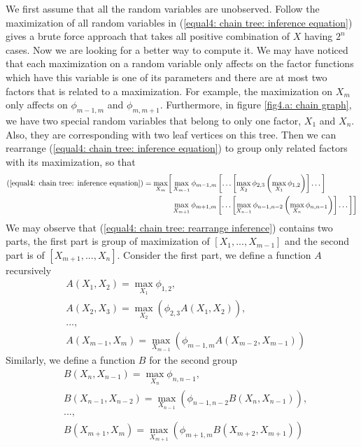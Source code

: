 We first assume that all the random variables are unobserved. Follow the maximization of all random variables in (\ref{equal4: chain tree: inference equation}) gives a brute force approach that takes all positive combination of $X$ having $2^n$ cases. Now we are looking for a better way to compute it. We may have noticed that each maximization on a random variable only affects on the factor functions which have this variable is one of its parameters and there are at most two factors that is related to a maximization. For example, the maximization on $X_m$ only affects on $\phi_{m-1, m}$ and $\phi_{m, m+1}$. Furthermore, in figure \ref{fig4.a: chain graph}, we have two special random variables that belong to only one factor, $X_1$ and $X_n$. Also, they are corresponding with two leaf vertices on this tree. Then we can rearrange (\ref{equal4: chain tree: inference equation}) to group only related factors with its maximization, so that
\begin{align}
	\begin{split}
		(\ref{equal4: chain tree: inference equation}) = \max_{X_m} \biggl[
		& \max_{X_{m-1}}{
			\phi_{m-1, m} \left[ \dots \left[  \max_{X_2}{
				\phi_{2,3} \left( \max_{X_1}{\phi_{1,2}} \right)
			} \right] \dots \right]
		} \\
		& \max_{X_{m+1}}{
			\phi_{m+1, m} \left[ \dots \left[  \max_{X_{n-1}}{
				\phi_{n-1,n-2} \left( \max_{X_n}{\phi_{n,n-1}} \right)
			} \right] \dots \right]
		}
		\biggr]
	\end{split}
	\label{equal4: chain tree: rearrange inference}
\end{align}
We may observe that (\ref{equal4: chain tree: rearrange inference}) contains two parts, the first part is group of maximization of $[X_1, ..., X_{m-1}]$ and the second part is of $[X_{m+1}, ..., X_{n}]$. Consider the first part, we define a function $A$ recursively
\begin{align*}
	& A(X_1, X_2) = \max_{X_1}{\phi_{1,2}}, \\
	& A(X_2, X_3) = \max_{X_2}{\left( \phi_{2,3}A(X_1, X_2) \right)}, \\
	& ..., \\
	& A(X_{m-1}, X_m) = \max_{X_{m-1}}{\left( \phi_{m-1,m}A(X_{m-2}, X_{m-1}) \right)}
\end{align*}
Similarly, we define a function $B$ for the second group
\begin{align*}
	& B(X_n, X_{n-1}) = \max_{X_n}{\phi_{n,n-1}}, \\
	& B(X_{n-1}, X_{n-2}) = \max_{X_{n-1}}{\left( \phi_{n-1,n-2}B(X_{n}, X_{n-1}) \right)}, \\
	& ..., \\
	& B(X_{m+1}, X_m) = \max_{X_{m+1}}{\left( \phi_{m+1,m}B(X_{m+2}, X_{m+1}) \right)}
\end{align*}
